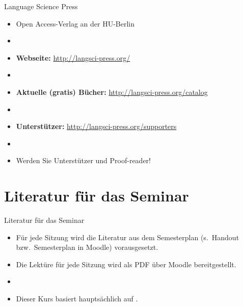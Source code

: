 \begin{frame}{Language Science Press}

\begin{itemize}
	
	\item Open Access-Verlag an der HU-Berlin
	\item[]

	\item \textbf{Webseite:}  \url{http://langsci-press.org/}
	\item[]

	\item \textbf{Aktuelle (gratis) Bücher:} \url{http://langsci-press.org/catalog}
	\item[]	

	\item \textbf{Unterstützer:}
	\url{http://langsci-press.org/supporters}
	\item[]	
	
	\item Werden Sie Unterstützer und Proof-reader!
		
\end{itemize}		

\end{frame}


\section{Literatur für das Seminar}

\begin{frame}{Literatur für das Seminar}

\begin{itemize}
	\item Für jede Sitzung wird die Literatur aus dem Semesterplan (s.~Handout bzw.\ Semesterplan in Moodle) vorausgesetzt.
	
	\item Die Lektüre für jede Sitzung wird als PDF über Moodle bereitgestellt.
	\item[]
	\item Dieser Kurs basiert hauptsächlich auf \citet{Krifka08a, Krifka13a, Luedeling12a, Freitag&MyP15a, MyP17c, Meindl11a, Rothstein11a, Albert&Marx10a}.

\end{itemize}		

\end{frame}


